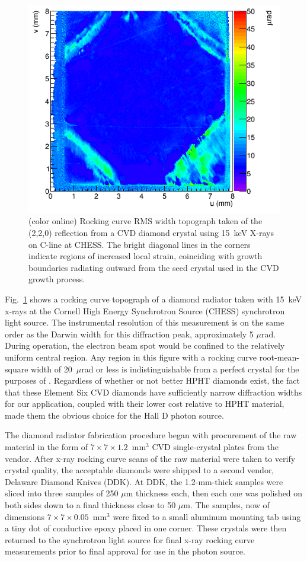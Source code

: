 \begin{figure}[tbp]
\begin{center}
 \includegraphics[clip=true,width=0.7\linewidth]{figures/JD70-8-study1_4_sigma_cropped.png}
\end{center}
\caption{(color online) Rocking curve RMS width topograph taken of the (2,2,0) reflection
from a CVD diamond crystal using 15~keV X-rays on C-line at CHESS.
The bright diagonal lines in the corners
indicate regions of increased local strain, coinciding with growth boundaries radiating
outward from the seed crystal used in the CVD growth process. 
        }
\label{fig:diamond_rocking_curve_rms} 
\end{figure}

Fig.~\ref{fig:diamond_rocking_curve_rms} shows a rocking curve topograph of a diamond
radiator taken with 15~keV x-rays at the 
Cornell High Energy Synchrotron Source (CHESS) synchrotron light source. The instrumental
resolution of this measurement is on the same order as the Darwin width for this
diffraction peak, approximately 5 $\mu$rad. During operation, the electron beam spot would
be confined to the relatively uniform central region. Any region in
this figure with a rocking curve root-mean-square width of 20~$\mu$rad or less is indistinguishable
from a perfect crystal for the purposes of \GX{}.
Regardless of whether or not better HPHT diamonds exist, the fact that these Element Six
CVD diamonds have sufficiently narrow diffraction widths for our application, coupled with
their lower cost relative to HPHT material, made them the
obvious choice for the Hall D photon source.

The diamond radiator fabrication procedure began with procurement of the raw
material in the form of $7\times 7\times 1.2$~mm$^3$ CVD single-crystal plates from the
vendor. After x-ray rocking curve scans of the raw material were taken to verify crystal
quality, the acceptable diamonds were shipped to a second vendor, Delaware Diamond Knives (DDK). At DDK, the
1.2-mm-thick samples were sliced into three samples of 250 $\mu$m thickness each, then
each one was polished on both sides down to a final thickness close to 50 $\mu$m. The
samples, now of dimensions $7\times 7\times 0.05$~mm$^3$ were fixed to a small aluminum
mounting tab using a tiny dot of conductive epoxy placed in one corner.
These crystals were then returned to the synchrotron light source
for final x-ray rocking curve measurements prior to final
approval for use in the \GX{} photon source.

